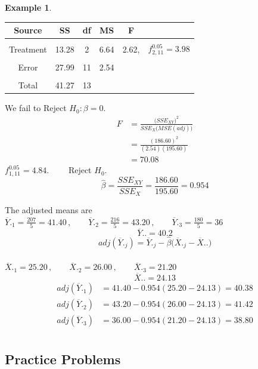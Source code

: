 \documentclass[11pt,a4paper]{article}
\theoremstyle{definition}
\newtheorem{exa}[thm]{Example}
\begin{document}
\begin{exa}
\begin{table}[H]
\centering
\begin{tabular}{|c|ccccc|}
\hline
Source & SS & df & MS & F & \\
\hline
&&&&&\\
Treatment & 13.28 & 2 & 6.64 & 2.62, & $f_{2,11}^{0.05}=3.98$\\
&&&&&\\
Error & 27.99 & 11 & 2.54 &&\\
&&&&&\\
\hline
Total & 41.27 & 13 &&&\\
\hline
\end{tabular}
\end{table}
We fail to Reject $H_0:\beta = 0$.\\


\begin{align*}
F & = \frac{\big(SSE_{XY}\big)^2}{SSE_X\big(MSE(adj)\big)}\\
  & = \frac{(186.60)^2}{(2.54)(195.60)}\\
  & = 70.08
\end{align*}
$\displaystyle{f^{0.05}_{1,11}=4.84.\qquad }$ Reject $H_0$.\\

$$\widehat{\beta}=\frac{SSE_{XY}}{SSE_X}=\frac{186.60}{195.60}=0.954$$

The adjusted means are\\
$\displaystyle{\overline{Y}._1=\frac{207}{5}=41.40}\,,\qquad  \displaystyle{\overline{Y}._2=\frac{216}{5}=43.20}\,,\qquad  \displaystyle{\overline{Y}._3=\frac{180}{5}=36}$
$$\overline{Y}.. = 40.2$$
$$adj(\overline{Y}._j)=\overline{Y}._j-\widehat{\beta}\big(\overline{X}._j-\overline{X}..\big)$$\\


$\overline{X}._1=25.20\,, \qquad  \overline{X}._2=26.00\,,\qquad  \overline{X}._3=21.20$
$$\overline{X}.. = 24.13$$
\begin{align*}
adj(\overline{Y}._1) & = 41.40 - 0.954(25.20-24.13)=40.38\\
adj(\overline{Y}._2) & = 43.20 - 0.954(26.00-24.13)=41.42\\
adj(\overline{Y}._3) & = 36.00 - 0.954(21.20-24.13)=38.80\\
\end{align*}


\end{exa}
\pagebreak

\subsection{Practice Problems}
\end{document}
